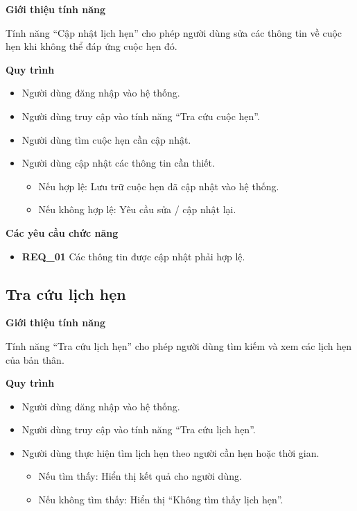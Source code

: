 \noindent \textbf{Giới thiệu tính năng}

Tính năng ``Cập nhật lịch hẹn'' cho phép người dùng sửa các thông tin về cuộc hẹn khi không thể đáp ứng cuộc hẹn đó.

\noindent \textbf{Quy trình}
\begin{itemize}
  \item Người dùng đăng nhập vào hệ thống.
  \item Người dùng truy cập vào tính năng ``Tra cứu cuộc hẹn''.
  \item Người dùng tìm cuộc hẹn cần cập nhật.
  \item Người dùng cập nhật các thông tin cần thiết.
    \begin{itemize}
      \item Nếu hợp lệ: Lưu trữ cuộc hẹn đã cập nhật vào hệ thống.
      \item Nếu không hợp lệ: Yêu cầu sửa / cập nhật lại.
    \end{itemize}
\end{itemize}

\noindent \textbf{Các yêu cầu chức năng}
\begin{itemize}
  \item \textbf{REQ\_01} Các thông tin được cập nhật phải hợp lệ.
\end{itemize}

\subsection{Tra cứu lịch hẹn}

\noindent \textbf{Giới thiệu tính năng}

Tính năng ``Tra cứu lịch hẹn'' cho phép người dùng tìm kiếm và xem các lịch hẹn của bản thân.

\noindent \textbf{Quy trình}
\begin{itemize}
  \item Người dùng đăng nhập vào hệ thống.
  \item Người dùng truy cập vào tính năng ``Tra cứu lịch hẹn''.
  \item Người dùng thực hiện tìm lịch hẹn theo người cần hẹn hoặc thời gian.
    \begin{itemize}
      \item Nếu tìm thấy: Hiển thị kết quả cho người dùng.
      \item Nếu không tìm thấy: Hiển thị ``Không tìm thấy lịch hẹn''.
    \end{itemize}
\end{itemize}

